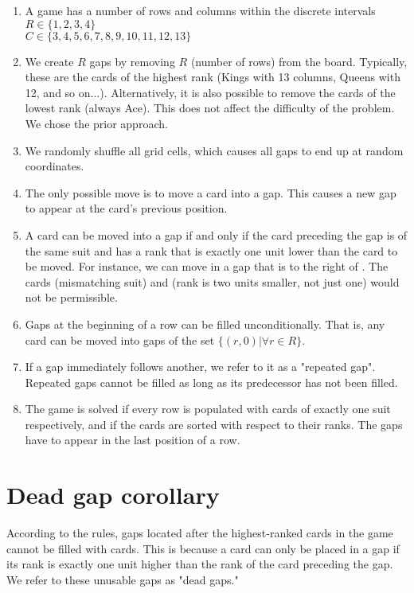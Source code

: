 \begin{enumerate}
    \item A game has a number of rows and columns within the discrete intervals\\
    $R \in \{1, 2, 3, 4\}$\\
    $C \in \{3, 4, 5, 6, 7, 8, 9, 10, 11, 12, 13\}$
    \item We create $R$ gaps by removing $R$ (number of rows) from the board. 
    Typically, these are the cards of the highest rank (Kings with 13 columns, Queens with 12, and so on...). 
    Alternatively, it is also possible to remove the cards of the lowest rank (always Ace).
    This does not affect the difficulty of the problem.
    We chose the prior approach.
    \item We randomly shuffle all grid cells, which causes all gaps to end up at random coordinates.
    \item The only possible move is to move a card into a gap.
    This causes a new gap to appear at the card's previous position.
    \item A card can be moved into a gap if and only if the card preceding the gap is of the same suit and has a rank that is exactly one unit lower than the card to be moved. 
    For instance, we can move  in a gap that is to the right of .
    The cards  (mismatching suit) and  (rank is two units smaller, not just one) would not be permissible.
    \item Gaps at the beginning of a row can be filled unconditionally.
    That is, any card can be moved into gaps of the set $\{(r, 0) | \forall r \in R\}$.
    \item If a gap immediately follows another, we refer to it as a "repeated gap". Repeated gaps cannot be filled as long as its predecessor has not been filled.
    \item The game is solved if every row is populated with cards of exactly one suit respectively, and if the cards are sorted with respect to their ranks. The gaps have to appear in the last position of a row.
\end{enumerate}

\section{Dead gap corollary}
According to the rules, gaps located after the highest-ranked cards in the game cannot be filled with cards. This is because a card can only be placed in a gap if its rank is exactly one unit higher than the rank of the card preceding the gap. We refer to these unusable gaps as "dead gaps."


